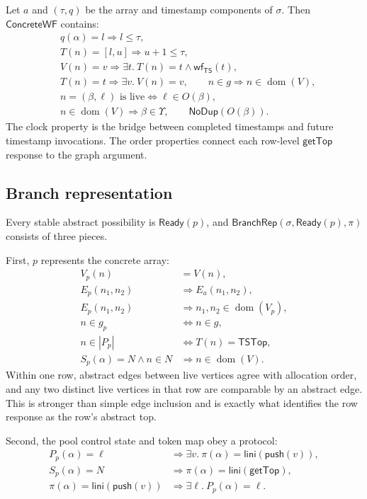 \documentclass[11pt]{article}
\theoremstyle{definition}
\theoremstyle{remark}
\newcommand{\TS}{\mathsf{TS}}
\newcommand{\topts}{\mathsf{TSTop}}
\newcommand{\interval}[2]{[#1,#2]}
\newcommand{\dom}{\mathop{\mathrm{dom}}}
\newcommand{\Ready}{\mathsf{Ready}}
\newcommand{\Lini}{\mathsf{lini}}
\newcommand{\GetTop}{\mathsf{getTop}}
\newcommand{\Push}{\mathsf{push}}
\newcommand{\arrayedge}{E_{\!a}}
\newcommand{\conc}{\sigma}
\newcommand{\tokens}{\pi}
\begin{document}
Let \(a\) and \((\tau,q)\) be the array and timestamp components of
\(\conc\).  Then \(\mathsf{ConcreteWF}\) contains:
\begin{align*}
&q(\alpha)=l \Longrightarrow l\le\tau,
\tag{WF-TS}\\
&T(n)=\interval{l}{u}\Longrightarrow u+1\le\tau,
\tag{WF-Clock}\\
&V(n)=v\Longrightarrow
  \exists t.\ T(n)=t\land\mathsf{wf}_{\TS}(t),
\tag{WF-Domain-1}\\
&T(n)=t\Longrightarrow\exists v.\ V(n)=v,
\qquad
 n\in g\Longrightarrow n\in\dom(V),
\tag{WF-Domain-2}\\
&n=(\beta,\ell)\text{ is live}
  \Longleftrightarrow \ell\in O(\beta),
\tag{WF-Order}\\
&n\in\dom(V)\Longrightarrow\beta\in\Upsilon,
\qquad \mathsf{NoDup}(O(\beta)).
\tag{WF-Threads}
\end{align*}
The clock property is the bridge between completed timestamps and future
timestamp invocations.  The order properties connect each row-level
\(\mathsf{getTop}\) response to the graph argument.

\subsection{Branch representation}

Every stable abstract possibility is \(\Ready(p)\), and
\(\mathsf{BranchRep}(\conc,\Ready(p),\tokens)\) consists of three pieces.

First, \(p\) represents the concrete array:
\begin{align*}
V_p(n)&=V(n),
\tag{Rep-V}\\
E_p(n_1,n_2)&\Longrightarrow \arrayedge(n_1,n_2),
\tag{Rep-E}\\
E_p(n_1,n_2)&\Longrightarrow n_1,n_2\in\dom(V_p),
\tag{Rep-Dom}\\
n\in g_p&\Longleftrightarrow n\in g,
\tag{Rep-G}\\
n\in |P_p|&\Longleftrightarrow T(n)=\topts,
\tag{Rep-P}\\
S_p(\alpha)=N\land n\in N&\Longrightarrow n\in\dom(V).
\tag{Rep-S}
\end{align*}
Within one row, abstract edges between live vertices agree with allocation
order, and any two distinct live vertices in that row are comparable by an
abstract edge.  This is stronger than simple edge inclusion and is exactly
what identifies the row response as the row's abstract top.

Second, the pool control state and token map obey a protocol:
\begin{align*}
P_p(\alpha)=\ell
  &\Longrightarrow \exists v.\ \pi(\alpha)=\Lini(\Push(v)),\\
S_p(\alpha)=N
  &\Longrightarrow \pi(\alpha)=\Lini(\GetTop),\\
\pi(\alpha)=\Lini(\Push(v))
  &\Longrightarrow \exists\ell.\ P_p(\alpha)=\ell.
\end{align*}
\end{document}
